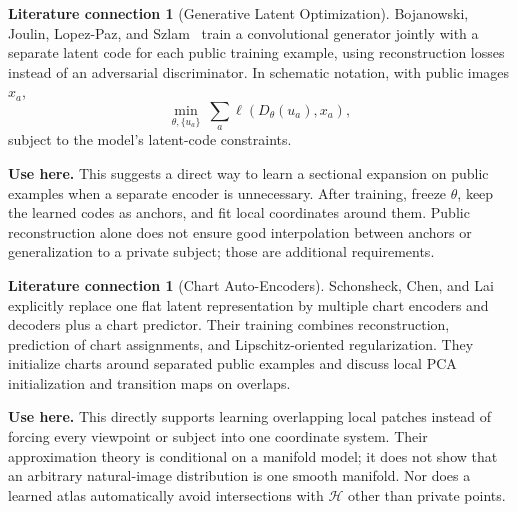 \documentclass[11pt,a4paper]{article}
\theoremstyle{definition}
\theoremstyle{definition}
\newtheorem{literature}[theorem]{Literature connection}
\theoremstyle{remark}\newtheorem{remark}[theorem]{Remark}
\newcommand{\HH}{\mathcal H}\newcommand{\XX}{\mathcal X}\newcommand{\col}{\operatorname{col}}
\begin{document}
\begin{literature}[Generative Latent Optimization]\label{lit:glo}
Bojanowski, Joulin, Lopez-Paz, and Szlam~\cite{glo} train a convolutional generator jointly with a separate latent code for each public training example, using reconstruction losses instead of an adversarial discriminator. In schematic notation, with public images $x_a$,
\[
\min_{\theta,\{u_a\}}\ \sum_a\ell(D_\theta(u_a),x_a),
\]
subject to the model's latent-code constraints.

\textbf{Use here.} This suggests a direct way to learn a sectional expansion on public examples when a separate encoder is unnecessary. After training, freeze $\theta$, keep the learned codes as anchors, and fit local coordinates around them. Public reconstruction alone does not ensure good interpolation between anchors or generalization to a private subject; those are additional requirements.
\end{literature}

\begin{literature}[Chart Auto-Encoders]\label{lit:chartae}
Schonsheck, Chen, and Lai~\cite{chartae} explicitly replace one flat latent representation by multiple chart encoders and decoders plus a chart predictor. Their training combines reconstruction, prediction of chart assignments, and Lipschitz-oriented regularization. They initialize charts around separated public examples and discuss local PCA initialization and transition maps on overlaps.

\textbf{Use here.} This directly supports learning overlapping local patches instead of forcing every viewpoint or subject into one coordinate system. Their approximation theory is conditional on a manifold model; it does not show that an arbitrary natural-image distribution is one smooth manifold. Nor does a learned atlas automatically avoid intersections with $\HH$ other than private points.
\end{literature}
\end{document}
